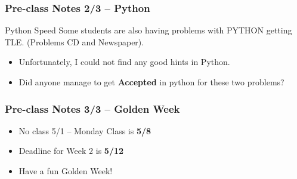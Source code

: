 \begin{frame}
  \frametitle{Pre-class Notes 2/3 -- Python}
  \begin{block}{Python Speed}
    Some students are also having problems with PYTHON getting
    TLE. (Problems CD and Newspaper).
  \end{block}

  \begin{itemize}
  \item Unfortunately, I could not find any good hints in Python.

  \item Did anyone manage to get {\bf Accepted} in python for these
    two problems?
  \end{itemize}
\end{frame}

\begin{frame}
  \frametitle{Pre-class Notes 3/3 -- Golden Week}

  \begin{itemize}
  \item No class 5/1 -- Monday Class is {\bf 5/8}
    \vfill
  \item Deadline for Week 2 is {\bf 5/12}
    \vfill
  \item Have a fun Golden Week!
  \end{itemize}
\end{frame}



